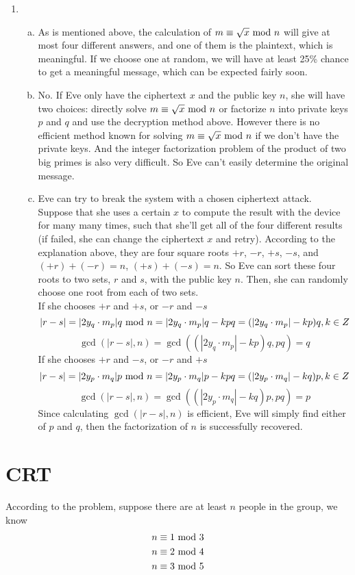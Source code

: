 \documentclass{article}
\renewcommand{\mod}{{\rm\ mod\ }}
\begin{document}
\begin{enumerate}
\item
\begin{enumerate}[a)]
\item
As is mentioned above, the calculation of $m\equiv \sqrt{x}\mod n$ will give at most four different answers, and one of them is the plaintext, which is meaningful. If we choose one at random, we will have at least 25\% chance to get a meaningful message, which can be expected fairly soon.
\item
No. If Eve only have the ciphertext $x$ and the public key $n$, she will have two choices: directly solve $m\equiv \sqrt{x}\mod n$ or factorize $n$ into private keys $p$ and $q$ and use the decryption method above. However there is no efficient method known for solving $m\equiv \sqrt{x}\mod n$ if we don't have the private keys. And the integer factorization problem of the product of two big primes is also very difficult. So Eve can't easily determine the original message.
\item
Eve can try to break the system with a chosen ciphertext attack.\\
Suppose that she uses a certain $x$ to compute the result with the device for many many times, such that she'll get all of the four different results (if failed, she can change the ciphertext $x$ and retry). According to the explanation above, they are four square roots $+r$, $-r$, $+s$, $-s$, and $(+r)+(-r)=n$, $(+s)+(-s)=n$. So Eve can sort these four roots to two sets, $r$ and $s$, with the public key $n$. Then, she can randomly choose one root from each of two sets.\\
If she chooses $+r$ and $+s$, or $-r$ and $-s$
$$|r-s|=|2y_q\cdot m_p|q\mod n=|2y_q\cdot m_p|q-kpq=(|2y_q\cdot m_p|-kp)q,k\in Z$$
$$\gcd(|r-s|,n)=\gcd((|2y_q\cdot m_p|-kp)q,pq)=q$$
If she chooses $+r$ and $-s$, or $-r$ and $+s$
$$|r-s|=|2y_p\cdot m_q|p\mod n=|2y_p\cdot m_q|p-kpq=(|2y_p\cdot m_q|-kq)p,k\in Z$$
$$\gcd(|r-s|,n)=\gcd((|2y_p\cdot m_q|-kq)p,pq)=p$$
Since calculating $\gcd(|r-s|,n)$ is efficient, Eve will simply find either of $p$ and $q$, then the factorization of $n$ is successfully recovered.
\end{enumerate}

\end{enumerate}

\section{CRT}

According to the problem, suppose there are at least $n$ people in the group, we know
\begin{align*}
n&\equiv 1\mod3\\
n&\equiv 2\mod4\\
n&\equiv 3\mod5
\end{align*}
\end{document}
